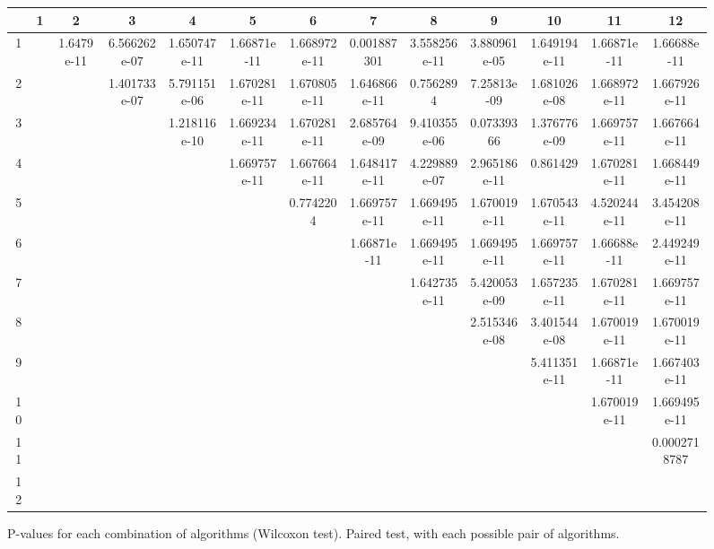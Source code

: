 \begin{landscape}
\begin{figure}
\begin{adjustwidth}{-1cm}{-1cm}
\begin{center}
	\begin{tabular}{|c|c|c|c|c|c|c|c|c|c|c|c|c|} \hline
		& 1 & 2 & 3 & 4 & 5 & 6 & 7 & 8 & 9 & 10 & 11 & 12 \\ \hline \hline
		1 & & 1.6479e-11 & 6.566262e-07 & 1.650747e-11 & 1.66871e-11 & 1.668972e-11 & 0.001887301 & 3.558256e-11 & 3.880961e-05 & 1.649194e-11 & 1.66871e-11 & 1.66688e-11 \\ \hline
		2 & &  & 1.401733e-07 & 5.791151e-06 & 1.670281e-11 & 1.670805e-11 & 1.646866e-11 & 0.7562894 & 7.25813e-09 & 1.681026e-08 & 1.668972e-11 & 1.667926e-11 \\ \hline
		3 & & &  & 1.218116e-10 & 1.669234e-11 & 1.670281e-11 & 2.685764e-09 & 9.410355e-06 & 0.07339366 & 1.376776e-09 & 1.669757e-11 & 1.667664e-11 \\ \hline
		4 & & & &  & 1.669757e-11 & 1.667664e-11 & 1.648417e-11 & 4.229889e-07 & 2.965186e-11 & 0.861429 & 1.670281e-11 & 1.668449e-11 \\ \hline
		5 & & & & &  & 0.7742204 & 1.669757e-11 & 1.669495e-11 & 1.670019e-11 & 1.670543e-11 & 4.520244e-11 & 3.454208e-11 \\ \hline
		6 & & & & & &  & 1.66871e-11 & 1.669495e-11 & 1.669495e-11 & 1.669757e-11 & 1.66688e-11 & 2.449249e-11 \\ \hline
		7 & & & & & & &  & 1.642735e-11 & 5.420053e-09 & 1.657235e-11 & 1.670281e-11 & 1.669757e-11 \\ \hline
		8 & & & & & & & & & 2.515346e-08 & 3.401544e-08 & 1.670019e-11 & 1.670019e-11 \\ \hline
		9 & & & & & & & & &  & 5.411351e-11 & 1.66871e-11 & 1.667403e-11 \\ \hline
		10 & & & & & & & & & & & 1.670019e-11 & 1.669495e-11 \\ \hline
		11 & & & & & & & & & & & & 0.0002718787 \\ \hline
		12 & & & & & & & & & & & & \\ \hline

	
	\end{tabular}
\end{center}
\end{adjustwidth}
\caption{P-values for each combination of algorithms (Wilcoxon test). Paired test, with each possible pair of algorithms.}
\label{pv wilcox}
\end{figure}
\end{landscape}

